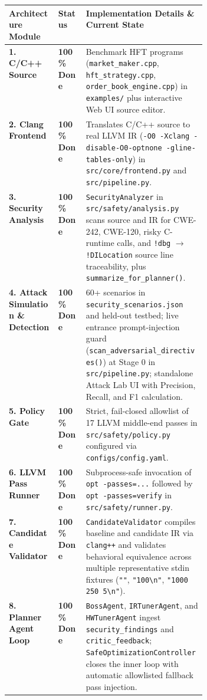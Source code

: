 \documentclass[11pt]{article}
\begin{document}
\begin{table}[h]
\centering
\small
\begin{tabularx}{\linewidth}{@{}p{0.25\linewidth}p{0.14\linewidth}Y@{}}
\toprule
\textbf{Architecture Module} & \textbf{Status} & \textbf{Implementation Details \& Current State} \\
\midrule
\textbf{1. C/C++ Source} & \textbf{100\% Done} & Benchmark HFT programs (\texttt{market\_maker.cpp}, \texttt{hft\_strategy.cpp}, \texttt{order\_book\_engine.cpp}) in \texttt{examples/} plus interactive Web UI source editor. \\
\textbf{2. Clang Frontend} & \textbf{100\% Done} & Translates C/C++ source to real LLVM IR (\texttt{-O0 -Xclang -disable-O0-optnone -gline-tables-only}) in \texttt{src/core/frontend.py} and \texttt{src/pipeline.py}. \\
\textbf{3. Security Analysis} & \textbf{100\% Done} & \texttt{SecurityAnalyzer} in \texttt{src/safety/analysis.py} scans source and IR for CWE-242, CWE-120, risky C-runtime calls, and \texttt{!dbg} $\rightarrow$ \texttt{!DILocation} source line traceability, plus \texttt{summarize\_for\_planner()}. \\
\textbf{4. Attack Simulation \& Detection} & \textbf{100\% Done} & 60+ scenarios in \texttt{security\_scenarios.json} and held-out testbed; live entrance prompt-injection guard (\texttt{scan\_adversarial\_directives()}) at Stage 0 in \texttt{src/pipeline.py}; standalone Attack Lab UI with Precision, Recall, and F1 calculation. \\
\textbf{5. Policy Gate} & \textbf{100\% Done} & Strict, fail-closed allowlist of 17 LLVM middle-end passes in \texttt{src/safety/policy.py} configured via \texttt{configs/config.yaml}. \\
\textbf{6. LLVM Pass Runner} & \textbf{100\% Done} & Subprocess-safe invocation of \texttt{opt -passes=...} followed by \texttt{opt -passes=verify} in \texttt{src/safety/runner.py}. \\
\textbf{7. Candidate Validator} & \textbf{100\% Done} & \texttt{CandidateValidator} compiles baseline and candidate IR via \texttt{clang++} and validates behavioral equivalence across multiple representative stdin fixtures (\texttt{""}, \texttt{"100\textbackslash n"}, \texttt{"1000 250 5\textbackslash n"}). \\
\textbf{8. Planner Agent Loop} & \textbf{100\% Done} & \texttt{BossAgent}, \texttt{IRTunerAgent}, and \texttt{HWTunerAgent} ingest \texttt{security\_findings} and \texttt{critic\_feedback}; \texttt{SafeOptimizationController} closes the inner loop with automatic allowlisted fallback pass injection. \\

\end{tabularx}
\end{table}
\end{document}
